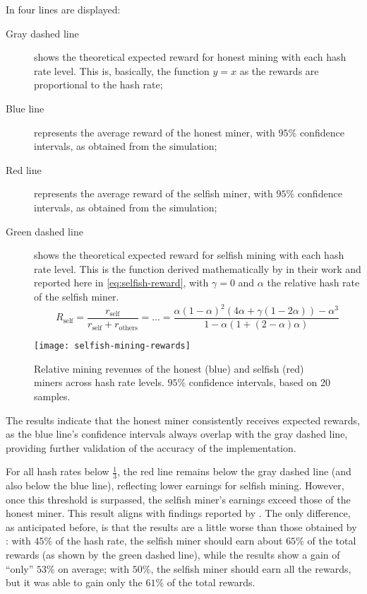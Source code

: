 \newpage
In  four lines are displayed:
\begin{description}
	\item[Gray dashed line] shows the theoretical expected reward for
		honest mining with each hash rate level. This is, basically,
		the function \(y = x\) as the rewards are proportional to the
		hash rate;
	\item[Blue line] represents the average reward of the honest miner,
		with \(95\%\) confidence intervals, as obtained from the
		simulation;
	\item[Red line] represents the average reward of the selfish miner,
		with \(95\%\) confidence intervals, as obtained from the
		simulation;
	\item[Green dashed line] shows the theoretical expected reward for
		selfish mining with each hash rate level. This is the function
		derived mathematically by \citeauthor{selfish-mining} in their
		work and reported here in \eqref{eq:selfish-reward}, with
		\(\gamma = 0\) and \(\alpha\) the relative hash rate of the
		selfish miner.
		\begin{equation}\label{eq:selfish-reward}
			R_{\text{self}} =
			\frac{r_{\text{self}}}{r_{\text{self}} +
			r_{\text{others}}} = \ldots = \frac{\alpha(1 -
			\alpha)^2(4\alpha + \gamma(1 - 2\alpha)) - \alpha^3}{1
			- \alpha(1 + (2 - \alpha)\alpha)}
		\end{equation}
\end{description}

\begin{figure}[tbh]
	\centering
	\texttt{[image: selfish-mining-rewards]}
	\caption{Relative mining revenues of the honest (blue) and selfish
	(red) miners across hash rate levels. \(95\%\) confidence intervals,
	based on 20 samples.}\label{fig:selfish-reward}
\end{figure}

The results indicate that the honest miner consistently receives expected
rewards, as the blue line's confidence intervals always overlap with the gray
dashed line, providing further validation of the accuracy of the \iblock{}
implementation.

For all hash rates below \(\frac{1}{3}\), the red line remains below the gray
dashed line (and also below the blue line), reflecting lower earnings for
selfish mining. However, once this threshold is surpassed, the selfish miner's
earnings exceed those of the honest miner. This result aligns with findings
reported by \citeauthor{selfish-mining}. The only difference, as anticipated
before, is that the results are a little worse than those obtained by
\citeauthor{selfish-mining}: with \(45\%\) of the hash rate, the selfish miner
should earn about \(65\%\) of the total rewards (as shown by the green dashed
line), while the results show a gain of ``only'' \(53\%\) on average; with
\(50\%\), the selfish miner should earn all the rewards, but it was able to
gain only the \(61\%\) of the total rewards.

